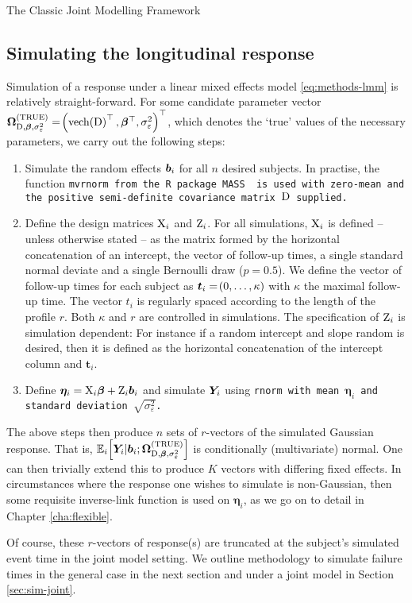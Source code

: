 \begin{chapter}{\label{cha:methods-classic}The Classic Joint Modelling Framework}
  \subsection{\label{sec:sim-longit}Simulating the longitudinal response}
  Simulation of a response under a linear mixed effects model \eqref{eq:methods-lmm} is relatively straight-forward. For some candidate parameter vector $\bm{\mathrm{\Omega}}_{\mathrm{D},\bm{\beta},\sigma^2_\varepsilon}^{(\mathrm{TRUE})}=\!\left(\text{vech}\!\left(\mathrm{D}\right)^\top,\bm{\beta}^\top,\sigma^2_\varepsilon\right)^\top$, which denotes the `true' values of the necessary parameters, we carry out the following steps:
  \begin{enumerate}
      \item Simulate the random effects $\bm{b}_i$ for all $n$ desired subjects. In practise, the function \tt{mvrnorm} from the \tt{R} package \tt{MASS} \citep{R-MASS} is used with zero-mean and the positive semi-definite covariance matrix $\mathrm{D}$ supplied.
      \item Define the design matrices $\mathrm{X}_i$ and $\mathrm{Z}_i$. For all simulations, $\mathrm{X}_i$ is defined -- unless otherwise stated -- as the matrix formed by the horizontal concatenation of an intercept, the vector of follow-up times, a single standard normal deviate and a single Bernoulli draw ($p=0.5$). We define the vector of follow-up times for each subject as $\bm{t}_i=\!\left(0,\dots,\kappa\right)$ with $\kappa$ the maximal follow-up time. The vector $t_i$ is regularly spaced according to the length of the profile $r$. Both $\kappa$ and $r$ are controlled in simulations. The specification of $\mathrm{Z}_i$ is simulation dependent: For instance if a random intercept and slope random is desired, then it is defined as the horizontal concatenation of the intercept column and $\bm{t}_i$.
      \item Define $\bm{\eta}_i=\mathrm{X}_i\bm{\beta}+\mathrm{Z}_i\bm{b}_i$ and simulate $\bm{Y}_i$ using \tt{rnorm} with mean $\bm{\eta}_i$ and standard deviation $\sqrt{\sigma^2_\varepsilon}$.
  \end{enumerate}
  The above steps then produce $n$ sets of $r$-vectors of the simulated Gaussian response. That is, $\mathbb{E}_i\!\left[\bm{Y}_i|\bm{b}_i;\bm{\mathrm{\Omega}}_{\mathrm{D},\bm{\beta},\sigma^2_\varepsilon}^{(\mathrm{TRUE})}\right]$ is conditionally (multivariate) normal. One can then trivially extend this to produce $K$ vectors with differing \eg fixed effects. In circumstances where the response one wishes to simulate is non-Gaussian, then some requisite inverse-link function is used on $\bm{\eta}_i$, as we go on to detail in Chapter \ref{cha:flexible}. 
  
  Of course, these $r$-vectors of response(s) are truncated at the subject's simulated event time in the joint model setting. We outline methodology to simulate failure times in the general case in the next section and under a joint model in Section \ref{sec:sim-joint}.


\end{chapter}
